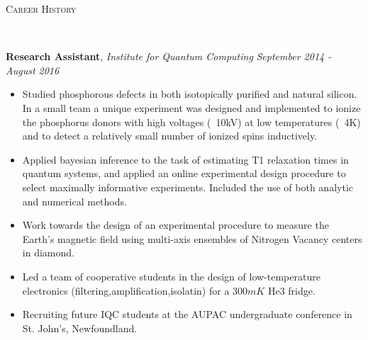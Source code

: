 \documentclass[9pt]{article}
\newenvironment{changemargin}[2]{%
  \begin{list}{}{%
    \setlength{\topsep}{0pt}%
    \setlength{\leftmargin}{#1}%
    \setlength{\rightmargin}{#2}%
    \setlength{\listparindent}{\parindent}%
    \setlength{\itemindent}{\parindent}%
    \setlength{\parsep}{\parskip}%
  }%
  \item[]}{\end{list}
}
\newcommand{\lineover}{
	\begin{changemargin}{-0.05in}{-0.05in}
		\vspace*{-8pt}
		\hrulefill \\
		\vspace*{-2pt}
	\end{changemargin}
}
\newcommand{\header}[1]{
	\begin{changemargin}{-0.5in}{-0.5in}
		\scshape{#1}\\
  	\lineover
	\end{changemargin}
}
\newenvironment{body} {
	\vspace*{-16pt}
	\begin{changemargin}{-0.25in}{-0.5in}
  }	
	{\end{changemargin}
}
\begin{document}
\smallskip


\header{Career History}

\begin{body}
	\vspace{14pt}
	\textbf{Research Assistant}, \emph{Institute for Quantum Computing} \hfill \emph{September 2014 - August 2016}\\
	\vspace*{-4pt}
	\begin{itemize} \itemsep -0pt  %
		\item Studied phosphorous defects in both isotopically purified and natural silicon. In a small team a unique experiment was designed
		and implemented to ionize the phosphorus donors with high voltages (~10kV) at low temperatures (~4K) and to detect a relatively small 
		number of ionized spins inductively.
		\item Applied bayesian inference to the task of estimating T1 relaxation times in quantum systems, and applied an online experimental 
		design procedure to select maximally informative experiments. Included the use of both analytic and numerical methods. 
		\item Work towards the design of an experimental procedure to measure the Earth's magnetic field using multi-axis 
		ensembles of Nitrogen Vacancy centers in diamond.
		\item Led a team of cooperative students in the design of low-temperature electronics (filtering,amplification,isolatin) for a $300mK$ He3 
		fridge. 
		\item Recruiting future IQC students at the AUPAC undergraduate conference in St. John's, Newfoundland. 


\end{itemize}
\end{body}
\end{document}
